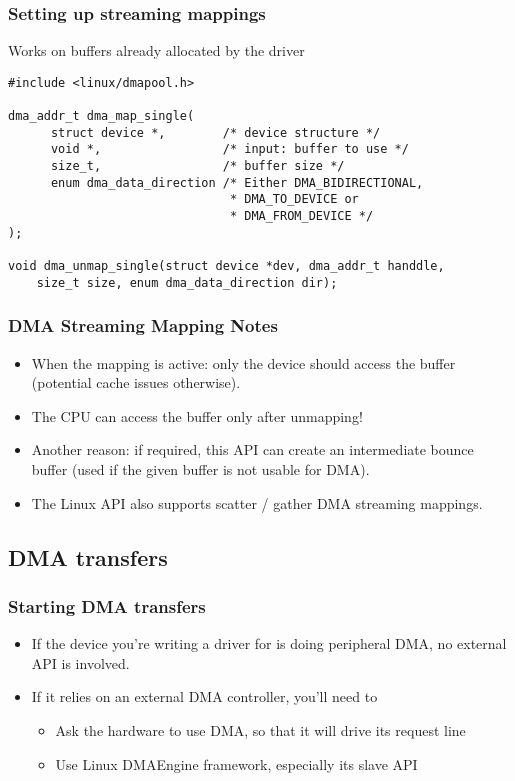 \begin{frame}[fragile]
  \frametitle{Setting up streaming mappings}
  Works on buffers already allocated by the driver
\begin{verbatim}
#include <linux/dmapool.h>

dma_addr_t dma_map_single(
      struct device *,        /* device structure */
      void *,                 /* input: buffer to use */
      size_t,                 /* buffer size */
      enum dma_data_direction /* Either DMA_BIDIRECTIONAL,
                               * DMA_TO_DEVICE or
                               * DMA_FROM_DEVICE */
);

void dma_unmap_single(struct device *dev, dma_addr_t handdle,
    size_t size, enum dma_data_direction dir);
\end{verbatim}
\end{frame}

\begin{frame}
  \frametitle{DMA Streaming Mapping Notes}
  \begin{itemize}
  \item When the mapping is active: only the device should access the
    buffer (potential cache issues otherwise).
  \item The CPU can access the buffer only after unmapping!
  \item Another reason: if required, this API can create an
    intermediate bounce buffer (used if the given buffer is not usable
    for DMA).
  \item The Linux API also supports scatter / gather DMA streaming
    mappings.
  \end{itemize}
\end{frame}

\subsection{DMA transfers}

\begin{frame}
  \frametitle{Starting DMA transfers}
  \begin{itemize}
  \item If the device you're writing a driver for is doing peripheral
    DMA, no external API is involved.
  \item If it relies on an external DMA controller, you'll need to
    \begin{itemize}
    \item Ask the hardware to use DMA, so that it will drive its
      request line
    \item Use Linux DMAEngine framework, especially its slave API
    \end{itemize}
  \end{itemize}
\end{frame}

